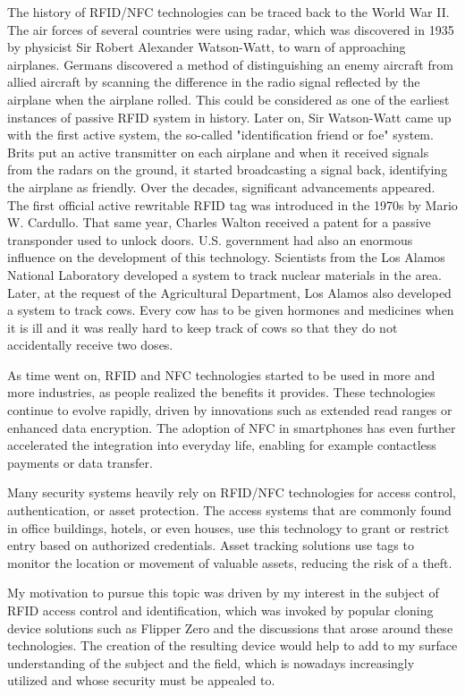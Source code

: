 The history of RFID/NFC technologies can be traced back to the World War II. The air forces of several countries were using radar, which was discovered in 1935 by physicist Sir Robert Alexander Watson-Watt, to warn of approaching airplanes. Germans discovered a method of distinguishing an enemy aircraft from allied aircraft by scanning the difference in the radio signal reflected by the airplane when the airplane rolled. This could be considered as one of the earliest instances of passive RFID system in history. Later on, Sir Watson-Watt came up with the first active system, the so-called "identification friend or foe" system. Brits put an active transmitter on each airplane and when it received signals from the radars on the ground, it started broadcasting a signal back, identifying the airplane as friendly. Over the decades, significant advancements appeared. The first official active rewritable RFID tag was introduced in the 1970s by Mario W. Cardullo. That same year, Charles Walton received a patent for a passive transponder used to unlock doors. U.S. government had also an enormous influence on the development of this technology. Scientists from the Los Alamos National Laboratory developed a system to track nuclear materials in the area. Later, at the request of the Agricultural Department, Los Alamos also developed a system to track cows. Every cow has to be given hormones and medicines when it is ill and it was really hard to keep track of cows so that they do not accidentally receive two doses.~\cite{violino2005history}

As time went on, RFID and NFC technologies started to be used in more and more industries, as people realized the benefits it provides. These technologies continue to evolve rapidly, driven by innovations such as extended read ranges or enhanced data encryption. The adoption of NFC in smartphones has even further accelerated the integration into everyday life, enabling for example contactless payments or data transfer.

Many security systems heavily rely on RFID/NFC technologies for access control, authentication, or asset protection. The access systems that are commonly found in office buildings, hotels, or even houses, use this technology to grant or restrict entry based on authorized credentials. Asset tracking solutions use tags to monitor the location or movement of valuable assets, reducing the risk of a theft.

My motivation to pursue this topic was driven by my interest in the subject of RFID access control and identification, which was invoked by popular cloning device solutions such as Flipper Zero and the discussions that arose around these technologies. The creation of the resulting device would help to add to my surface understanding of the subject and the field, which is nowadays increasingly utilized and whose security must be appealed to.

